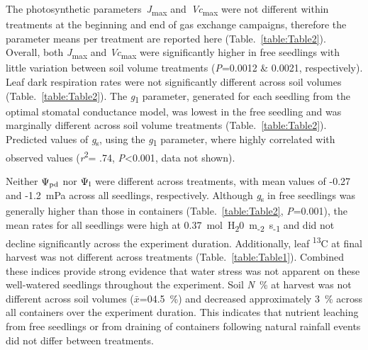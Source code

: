\documentclass[a4paper]{article}\usepackage[]{graphicx}\usepackage[]{color}
\begin{document}
The photosynthetic parameters~\textit{J}\textsubscript{max} and~\textit{Vc}\textsubscript{max} were not different within treatments at the beginning and end of gas exchange campaigns, therefore the parameter means per treatment are reported here (Table.~\ref{table:Table2}).  Overall, both \textit{J}\textsubscript{max} and \textit{Vc}\textsubscript{max} were significantly higher in free seedlings with little variation between soil volume treatments (\textit{P}=0.0012 \& 0.0021, respectively). Leaf dark respiration rates were not significantly different across soil volumes (Table.~\ref{table:Table2}). The \textit{g}\textsubscript{1} parameter, generated for each seedling from the \citet{medlyn2012reconciling} optimal stomatal conductance model, was lowest in the free seedling and was marginally different across soil volume treatments (Table.~\ref{table:Table2}). Predicted values of \textit{g}\textsubscript{s}, using the \textit{g}\textsubscript{1} parameter, where highly correlated with observed values (\textit{r}\textsuperscript{2}= .74, \textit{P}\textless{0.001}, data not shown).

Neither $\Psi\textsubscript{pd}$ nor $\Psi\textsubscript{l}$ were different across treatments, with mean values of -0.27 and -1.2~mPa across all seedlings, respectively. Although \textit{g}\textsubscript{s} in free seedlings was generally higher than those in containers (Table.~\ref{table:Table2}, \textit{P}=0.001), the mean rates for all seedlings were high at 0.37~mol~H\textsubscript{2}0~m\textsubscript{-2}~s\textsubscript{-1} and did not decline significantly across the experiment duration. Additionally, leaf {\textdelta}\textsuperscript{13}C at final harvest was not different across treatments (Table.~\ref{table:Table1}). Combined these indices provide strong evidence that water stress was not apparent on these well-watered seedlings throughout the experiment. Soil \textit{N}~\% at harvest was not different across soil volumes ($\bar{x}$=04.5~\%) and decreased approximately 3~\% across all containers over the experiment duration. This indicates that nutrient leaching from free seedlings or from draining of containers following natural rainfall events did not differ between treatments. 
\end{document}
